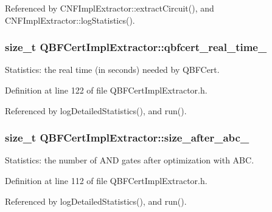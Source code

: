 Referenced by C\-N\-F\-Impl\-Extractor\-::extract\-Circuit(), and C\-N\-F\-Impl\-Extractor\-::log\-Statistics().

\hypertarget{classQBFCertImplExtractor_ab596205af9db44f69af214adca44201c}{
\subsubsection[{qbfcert\-\_\-real\-\_\-time\-\_\-}]{\setlength{\rightskip}{0pt plus 5cm}size\-\_\-t Q\-B\-F\-Cert\-Impl\-Extractor\-::qbfcert\-\_\-real\-\_\-time\-\_\-\hspace{0.3cm}{\ttfamily [protected]}}}\label{classQBFCertImplExtractor_ab596205af9db44f69af214adca44201c}


Statistics\-: the real time (in seconds) needed by Q\-B\-F\-Cert. 



Definition at line 122 of file Q\-B\-F\-Cert\-Impl\-Extractor.\-h.



Referenced by log\-Detailed\-Statistics(), and run().

\hypertarget{classQBFCertImplExtractor_a18a1c9ab317cada48d54b7006124190e}{
\subsubsection[{size\-\_\-after\-\_\-abc\-\_\-}]{\setlength{\rightskip}{0pt plus 5cm}size\-\_\-t Q\-B\-F\-Cert\-Impl\-Extractor\-::size\-\_\-after\-\_\-abc\-\_\-\hspace{0.3cm}{\ttfamily [protected]}}}\label{classQBFCertImplExtractor_a18a1c9ab317cada48d54b7006124190e}


Statistics\-: the number of A\-N\-D gates after optimization with A\-B\-C. 



Definition at line 112 of file Q\-B\-F\-Cert\-Impl\-Extractor.\-h.



Referenced by log\-Detailed\-Statistics(), and run().

